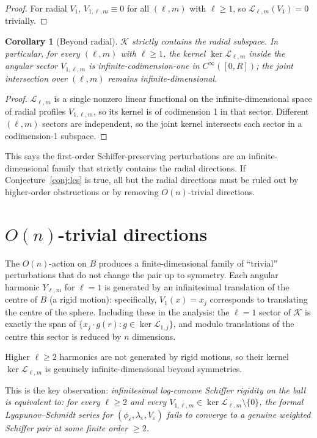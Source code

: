 \documentclass[11pt]{article}
\newcommand{\eps}{\varepsilon}
\newcommand{\1}{\mathbf 1}
\newtheorem{cor}[lem]{Corollary}
\begin{document}
\begin{proof}
For radial $V_1$, $V_{1,\ell,m}\equiv 0$ for all $(\ell,m)$ with
$\ell\ge 1$, so $\mathcal{L}_{\ell,m}(V_1)=0$ trivially.
\end{proof}

\begin{cor}[Beyond radial]\label{cor:beyond}
$\mathcal{K}$ strictly contains the radial subspace. In particular,
for every $(\ell,m)$ with $\ell\ge 1$, the kernel
$\ker\mathcal{L}_{\ell,m}$ inside the angular sector $V_{1,\ell,m}$
is infinite-codimension-one in $C^\infty([0,R])$; the joint
intersection over $(\ell,m)$ remains infinite-dimensional.
\end{cor}

\begin{proof}
$\mathcal{L}_{\ell,m}$ is a single nonzero linear functional on the
infinite-dimensional space of radial profiles $V_{1,\ell,m}$, so its
kernel is of codimension 1 in that sector. Different $(\ell,m)$
sectors are independent, so the joint kernel intersects each sector
in a codimension-1 subspace.
\end{proof}

This says the first-order Schiffer-preserving perturbations are an
infinite-dimensional family that strictly contains the radial
directions. If Conjecture~\ref{conj:lcs} is true, all but the radial
directions must be ruled out by higher-order obstructions or by
removing $O(n)$-trivial directions.

\section{$O(n)$-trivial directions}

The $O(n)$-action on $B$ produces a finite-dimensional family of
``trivial'' perturbations that do not change the pair up to symmetry.
Each angular harmonic $Y_{\ell,m}$ for $\ell=1$ is generated by an
infinitesimal translation of the centre of $B$ (a rigid motion):
specifically, $V_1(x)=x_j$ corresponds to translating the centre of
the sphere. Including these in the analysis: the $\ell=1$ sector of
$\mathcal{K}$ is exactly the span of $\{x_j\cdot g(r):g\in
\ker\mathcal L_{1,j}\}$, and modulo translations of the centre this
sector is reduced by $n$ dimensions.

Higher $\ell\ge 2$ harmonics are not generated by rigid motions, so
their kernel $\ker\mathcal{L}_{\ell,m}$ is genuinely
infinite-dimensional beyond symmetries.

This is the key observation: \emph{infinitesimal log-concave Schiffer
rigidity on the ball is equivalent to: for every $\ell\ge 2$ and every
$V_{1,\ell,m}\in\ker\mathcal{L}_{\ell,m}\setminus\{0\}$, the
formal Lyapunov--Schmidt series for $(\phi_\eps,\lambda_\eps,V_\eps)$
fails to converge to a genuine weighted Schiffer pair at some finite
order $\ge 2$.}
\end{document}
